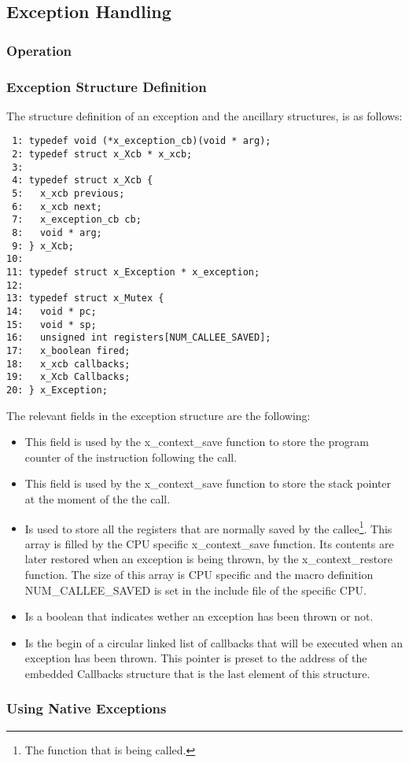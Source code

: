 %
%

\subsection{Exception Handling}

\subsubsection{Operation}

\subsubsection{Exception Structure Definition}

The structure definition of an exception and the ancillary structures, is as follows:

\bcode
\begin{verbatim}
 1: typedef void (*x_exception_cb)(void * arg);
 2: typedef struct x_Xcb * x_xcb;
 3:
 4: typedef struct x_Xcb {
 5:   x_xcb previous;
 6:   x_xcb next;
 7:   x_exception_cb cb;
 8:   void * arg;
 9: } x_Xcb;
10:
11: typedef struct x_Exception * x_exception;
12:
13: typedef struct x_Mutex {
14:   void * pc;
15:   void * sp;
16:   unsigned int registers[NUM_CALLEE_SAVED];
17:   x_boolean fired;
18:   x_xcb callbacks;
19:   x_Xcb Callbacks;
20: } x_Exception;
\end{verbatim}
\ecode

The relevant fields in the exception structure are the following:

\begin{itemize}
\item {} This field is used by the
\textsf{x\_context\_save} function to store the program counter of the
instruction following the call.
\item {} This field is used by the
\textsf{x\_context\_save} function to store the stack pointer at the moment
of the the call.
\item {} Is used to store all the
registers that are normally saved by the callee\footnote{The function that
is being called.}. This array is filled by the CPU specific
\textsf{x\_context\_save} function. Its contents are later restored when an
exception is being thrown, by the \textsf{x\_context\_restore} function. The
size of this array is CPU specific and the macro definition
\textsf{NUM\_CALLEE\_SAVED} is set in the include file of the specific CPU.
\item {} Is a boolean that indicates wether
an exception has been thrown or not.
\item {} Is the begin of a circular
linked list of callbacks that will be executed when an exception has been
thrown. This pointer is preset to the address of the embedded
\textsf{Callbacks} structure that is the last element of this structure.
\end{itemize}

\subsubsection{Using Native Exceptions}
